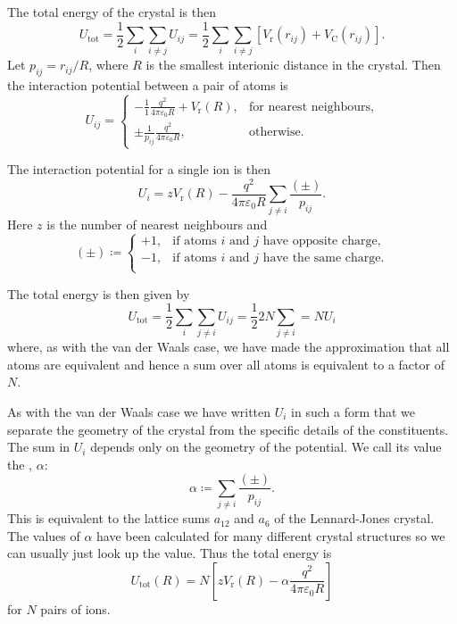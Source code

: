 \documentclass[fleqn]{NotesClass}
\newcommand*{\tot}{\mathrm{tot}}
\begin{document}
    The total energy of the crystal is then
    \begin{equation}
        U_{\tot} = \frac{1}{2}\sum_{i} \sum_{i\ne j} U_{ij} = \frac{1}{2} \sum_{i} \sum_{i\ne j} [V_{\mathrm{r}}(r_{ij}) + V_{\mathrm{C}}(r_{ij})].
    \end{equation}
    Let \(p_{ij} = r_{ij}/R\), where \(R\) is the smallest interionic distance in the crystal.
    Then the interaction potential between a pair of atoms is
    \begin{equation}
        U_{ij} =
        \begin{cases}
            -\frac{1}{1}\frac{q^2}{4\pi\varepsilon_0R} + V_{\mathrm{r}}(R), & \text{for nearest neighbours},\\
            \pm \frac{1}{p_{ij}} \frac{q^2}{4\pi\varepsilon_0R}, & \text{otherwise}.
        \end{cases}
    \end{equation}
    
    The interaction potential for a single ion is then
    \begin{equation}
        U_i = zV_{\mathrm{r}}(R) - \frac{q^2}{4\pi\varepsilon_0 R} \sum_{j\ne i} \frac{(\pm)}{p_{ij}}.
    \end{equation}
    Here \(z\) is the number of nearest neighbours and
    \begin{equation}
        (\pm) \coloneqq 
        \begin{cases}
            +1, &\text{if atoms \(i\) and \(j\) have opposite charge},\\
            -1, &\text{if atoms \(i\) and \(j\) have the same charge}.\\
        \end{cases}
    \end{equation}
    
    The total energy is then given by
    \begin{equation}
        U_{\tot} = \frac{1}{2}\sum_{i} \sum_{j\ne i} U_{ij} = \frac{1}{2}2N\sum_{j\ne i} = NU_i
    \end{equation}
    where, as with the van der Waals case, we have made the approximation that all atoms are equivalent and hence a sum over all atoms is equivalent to a factor of \(N\).
    
    As with the van der Waals case we have written \(U_i\) in such a form that we separate the geometry of the crystal from the specific details of the constituents.
    The sum in \(U_i\) depends only on the geometry of the potential.
    We call its value the , \(\alpha\):
    \begin{equation}
        \alpha \coloneqq \sum_{j\ne i} \frac{(\pm)}{p_{ij}}.
    \end{equation}
    This is equivalent to the lattice sums \(a_{12}\) and \(a_{6}\) of the Lennard-Jones crystal.
    The values of \(\alpha\) have been calculated for many different crystal structures so we can usually just look up the value.
    Thus the total energy is
    \begin{equation}
        U_{\tot}(R) = N\left[ zV_{\mathrm{r}}(R) - \alpha\frac{q^2}{4\pi\varepsilon_0R} \right]
    \end{equation}
    for \(N\) pairs of ions.
    
\end{document}
